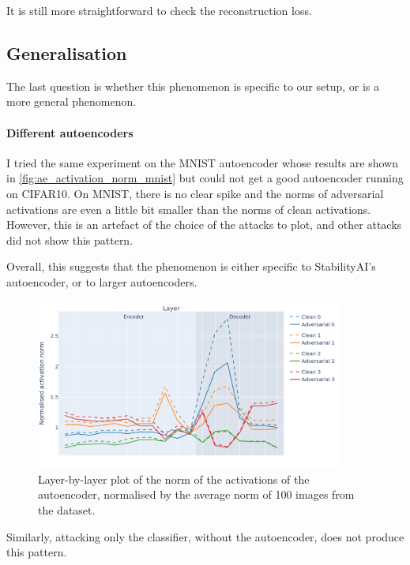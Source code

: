 \documentclass[]{scrarticle}
\begin{document}
\begin{remark}
  It is still more straightforward to check the reconstruction loss.
\end{remark}

\subsection{Generalisation}

The last question is whether this phenomenon is specific to
our setup, or is a more general phenomenon.

\paragraph{Different autoencoders}
I tried the same experiment on the MNIST autoencoder
whose results are shown in
\autoref{fig:ae_activation_norm_mnist}
but could not get a good autoencoder running on CIFAR10.
On MNIST, there is no clear spike and the norms of adversarial
activations are even a little bit smaller than the norms of clean activations.
However, this is an artefact of the choice of the attacks to plot,
and other attacks did not show this pattern.

Overall, this suggests that the phenomenon is either specific
to StabilityAI's autoencoder, or to larger autoencoders.

\begin{figure}[h]
  \centering
  \includegraphics[width=0.9\textwidth]{../images/ae_activation_norm_MNIST.png}
  \caption{
    Layer-by-layer plot of the norm of the activations of the autoencoder,
    normalised by the average norm of 100 images from the dataset.
  }
  \label{fig:ae_activation_norm_mnist}
\end{figure}


Similarly, attacking only the classifier, without the autoencoder,
does not produce this pattern.
\end{document}
